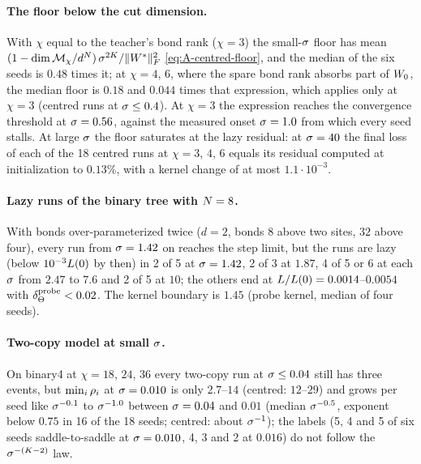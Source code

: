 \paragraph{The floor below the cut dimension.}
\empirical{} With $\chi$ equal to the teacher's bond rank ($\chi=3$) the small-$\sigma$ floor has mean
$(1-\dim\mathcal M_\chi/d^N)\,\sigma^{2K}/\lVert W^{*}\rVert_{F}^2$ \eqref{eq:A-centred-floor}, and the median of the six seeds is
$0.48$ times it; at $\chi=4$, $6$, where the spare bond rank absorbs part of $W_{0}$, the median floor is $0.18$ and
$0.044$ times that expression, which applies only at $\chi=3$ (centred runs at $\sigma\le0.4$). At $\chi=3$ the expression
reaches the convergence threshold at $\sigma=0.56$, against the measured onset $\sigma=1.0$ from which every seed stalls.
At large $\sigma$ the floor saturates at the lazy residual: at $\sigma=40$ the final loss of each of the 18 centred runs
at $\chi=3$, $4$, $6$ equals its residual computed at initialization to $0.13\%$, with a kernel change of at most
$1.1\cdot10^{-3}$.

\paragraph{Lazy runs of the binary tree with $N=8$.}
\empirical{} With bonds over-parameterized twice ($d=2$, bonds $8$ above two sites, $32$ above four), every run from
$\sigma=1.42$ on reaches the step limit, but the runs are lazy (below $10^{-3}L(0)$ by then) in 2 of 5 at
$\sigma=1.42$, 2 of 3 at $1.87$, 4 of 5 or 6 at each $\sigma$ from $2.47$ to $7.6$ and 2 of 5 at $10$; the others end at
$L/L(0)=0.0014$--$0.0054$ with $\delta_{\Theta}^{\rm probe}<0.02$. The kernel boundary is $1.45$ (probe kernel, median of
four seeds).

\paragraph{Two-copy model at small $\sigma$.}
\empirical{} On binary4 at $\chi=18$, $24$, $36$ every two-copy run at $\sigma\le0.04$ still has three events, but
$\min_i\rho_{i}$ at $\sigma=0.010$ is only $2.7$--$14$ (centred: $12$--$29$) and grows per seed like $\sigma^{-0.1}$ to
$\sigma^{-1.0}$ between $\sigma=0.04$ and $0.01$ (median $\sigma^{-0.5}$, exponent below $0.75$ in 16 of the 18 seeds;
centred: about $\sigma^{-1}$); the labels (5, 4 and 5 of six seeds
saddle-to-saddle at $\sigma=0.010$, 4, 3 and 2 at $0.016$) do not follow the $\sigma^{-(K-2)}$ law.

